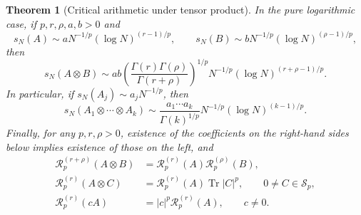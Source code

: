 \documentclass[10pt,reqno]{amsart}
\theoremstyle{plain}
\newtheorem{theorem}{Theorem}[section]
\theoremstyle{definition}
\theoremstyle{remark}
\begin{document}
\begin{theorem}[Critical arithmetic under tensor product]
In the pure logarithmic case, if \(p,r,\rho,a,b>0\) and
\[
 s_N(A)\sim aN^{-1/p}(\log N)^{(r-1)/p},\qquad
 s_N(B)\sim bN^{-1/p}(\log N)^{(\rho-1)/p},
\]
then
\begin{equation}
 s_N(A\otimes B)
 \sim ab\left(
 \frac{\Gamma(r)\Gamma(\rho)}{\Gamma(r+\rho)}
 \right)^{1/p}
 N^{-1/p}(\log N)^{(r+\rho-1)/p}.
 \label{cc:eq:amplitude-convolution}
\end{equation}
In particular, if \(s_N(A_j)\sim a_jN^{-1/p}\), then
\begin{equation}
 s_N(A_1\otimes\cdots\otimes A_k)
 \sim\frac{a_1\cdots a_k}{\Gamma(k)^{1/p}}
 N^{-1/p}(\log N)^{(k-1)/p}.
 \label{cc:eq:kfold-simple-atoms}
\end{equation}
Finally, for any \(p,r,\rho>0\), existence of the coefficients on the
right-hand sides below implies existence of those on the left, and
\begin{align}
 \mathscr R_p^{(r+\rho)}(A\otimes B)
 &=\mathscr R_p^{(r)}(A)\mathscr R_p^{(\rho)}(B),
 \label{cc:eq:coefficient-product}\\
 \mathscr R_p^{(r)}(A\otimes C)
 &=\mathscr R_p^{(r)}(A)\operatorname{Tr}|C|^p,
 \qquad 0\ne C\in\mathcal S_p,
 \label{cc:eq:coefficient-decoration}\\
 \mathscr R_p^{(r)}(cA)
 &=|c|^p\mathscr R_p^{(r)}(A),\qquad c\ne0.
 \label{cc:eq:coefficient-scalar}
\end{align}
\end{theorem}
\end{document}

